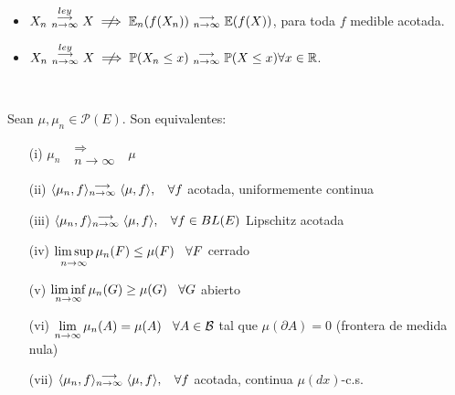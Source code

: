 \begin{remark}
\beforeitemize
\begin{itemize}
    \item $X_n\mbox{ }\overset{ley}{\substack{\longrightarrow \\n \to \infty}}\mbox{ }X \centernot\implies \mathbb{E}_n(f(X_n)) \mbox{ }\substack{\longrightarrow \\ n\to\infty}\mbox{ } \mathbb{E}(f(X))$, para toda $f$ medible acotada.
    \item $X_n\mbox{ }\overset{ley}{\substack{\longrightarrow \\n \to \infty}}\mbox{ }X \centernot\implies \mathbb{P}(X_n\leq x) \conv \mathbb{P}(X\leq x) \forall x \in \mathbb{R}$.
\end{itemize}

\end{remark}
\vspace{2cm}\\
\begin{theorem}[Portmanteau] Sean $\mu,\mu_n \in \mathcal{P}(E)$. Son equivalentes:
\label{portmanteau}
\begin{enumerate}
    \item[(i)] $\mu_n \mbox{ }\substack{\Longrightarrow \\n \to \infty}\mbox{ } \mu$
    \item[(ii)] $\langle \mu_n,f\rangle { }\substack{\longrightarrow \\ n\to\infty}\mbox{ } \langle \mu,f\rangle, \hspace{.25cm}\, \forall f$ acotada, uniformemente continua
    \item[(iii)]$\langle \mu_n,f\rangle { }\substack{\longrightarrow \\ n\to\infty}\mbox{ } \langle \mu,f\rangle, \hspace{.25cm}\, \forall f \in BL(E)$ Lipschitz acotada
    \item[(iv)] $\displaystyle\limsup_{n\to\infty} \mu_n (F)\leq\mu(F) \hspace{.25cm}\, \forall F $ cerrado
    \item[(v)] $\displaystyle\liminf_{n\to\infty} \mu_n (G)\geq\mu(G) \hspace{.25cm}\, \forall G $ abierto
    \item[(vi)] $\displaystyle\lim_{n\to\infty}\mu_n(A) = \mu(A) \hspace{.25cm}\, \forall A \in \mathcal{B}$ tal que $\mu(\partial A)=0$ (frontera de medida nula)
    \item[(vii)] $\langle \mu_n,f\rangle { }\substack{\longrightarrow \\ n\to\infty}\mbox{ } \langle \mu,f\rangle, \hspace{.25cm}\, \forall f$ acotada, continua $\mu(dx)$-c.s.
\end{enumerate}
\end{theorem}
